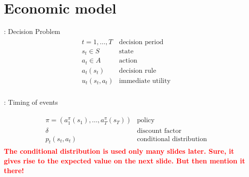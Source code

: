 \section{Economic model}
\begin{frame}{\insertsection: Decision Problem}
\begin{align*}\begin{array}{ll}
t = 1, \hdots, T& \text{decision period} \\[0.5em]
s_t\in S & \text{state}  \\[0.5em]
a_t\in A & \text{action} \\[0.5em]
a_t(s_t) & \text{decision rule} \\[0.5em]
u_t(s_t, a_t) & \text{immediate utility}\\[0.5em]
\end{array}\end{align*}
\end{frame}
\begin{frame}{\insertsection: Timing of events}
\vspace{1.5cm}
\scalebox{0.9}{\hspace{-0.2cm}}
\end{frame}
\begin{frame}{\insertsection}
\begin{align*}\begin{array}{ll}
\pi = (a^\pi_1(s_1), \hdots, a^\pi_T(s_T)) & \text{policy}\\[0.5em]
\delta & \text{discount factor} \\[0.5em]
p_t(s_t, a_t) & \text{conditional distribution}
\end{array}\end{align*}
\textbf{\textcolor{red}{The conditional distribution is used only many slides later. Sure, it gives rise to the expected value on the next slide. But then mention it there!}}
\end{frame}
